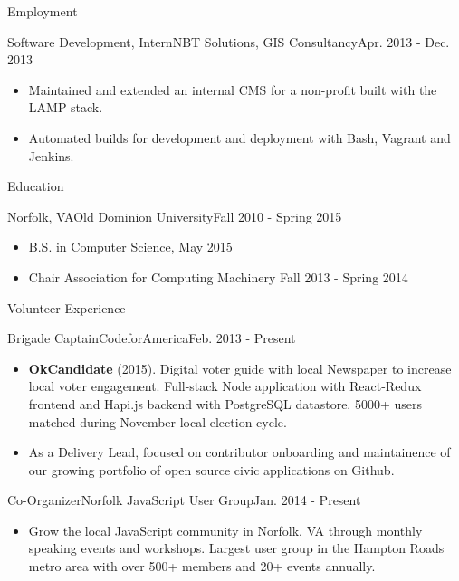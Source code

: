\documentclass[]{mcdowellcv}
\begin{document}
\begin{cvsection}{Employment}
		\begin{cvsubsection}{Software Development, Intern}{NBT Solutions, GIS Consultancy}{Apr. 2013 - Dec. 2013}
			\begin{itemize}
				\item Maintained and extended an internal CMS for a non-profit built with the LAMP stack.
				\item Automated builds for development and deployment with Bash, Vagrant and Jenkins.
			\end{itemize}
		\end{cvsubsection}

	\end{cvsection}

	\begin{cvsection}{Education}
		\begin{cvsubsection}{Norfolk, VA}{Old Dominion University}{Fall 2010 - Spring 2015}
			\begin{itemize}
				\item B.S. in Computer Science, May 2015
				\item Chair Association for Computing Machinery Fall 2013 - Spring 2014
			\end{itemize}
		\end{cvsubsection}
	\end{cvsection}

	\begin{cvsection}{Volunteer Experience}
		\begin{cvsubsection}{Brigade Captain}{CodeforAmerica}{Feb. 2013 - Present}
			\begin{itemize}
				\item \textbf{OkCandidate} (2015). Digital voter guide with local Newspaper to increase local voter engagement. Full-stack Node application with React-Redux frontend and Hapi.js backend with PostgreSQL datastore. 5000+ users matched during November local election cycle.
				\item As a Delivery Lead, focused on contributor onboarding and maintainence of our growing portfolio of open source civic applications on Github.
			\end{itemize}

		\end{cvsubsection}

		\begin{cvsubsection}{Co-Organizer}{Norfolk JavaScript User Group}{Jan. 2014 - Present}
			\begin{itemize}
				\item Grow the local JavaScript community in Norfolk, VA through monthly speaking events and workshops. Largest user group in the Hampton Roads metro area with over 500+ members and 20+ events annually.
			\end{itemize}
		\end{cvsubsection}

	\end{cvsection}
\end{document}
